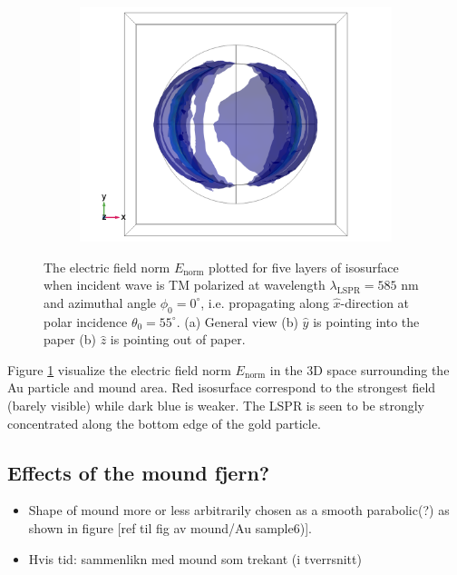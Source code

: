 \begin{figure}[h!]
\begin{subfigure}{0.33\textwidth}
        \centering
        \includegraphics[width=\linewidth, trim=0.6cm 0 1.6cm 0, clip]{figures/ch4/S6/normE/Sample6_nomE_wl585_phi0_TM_ztowardsviewer.png}
        \caption{}
    \end{subfigure}
    \caption{The electric field norm $E_\text{norm}$ plotted for five layers of isosurface when incident wave is TM polarized at wavelength $\lambda_{\text{LSPR}}=585$ nm and azimuthal angle $\phi_0=0^\circ$, i.e. propagating along $\hat{x}$-direction at polar incidence $\theta_0=55^\circ$. (a) General view (b) $\hat{y}$ is pointing into the paper (b) $\hat{z}$ is pointing out of paper.}
    \label{fig:S6_normE_isosurface_LSPR}
\end{figure}

Figure \ref{fig:S6_normE_isosurface_LSPR} visualize the electric field norm $E_\text{norm}$ in the 3D space surrounding the Au particle and mound area. Red isosurface correspond to the strongest field (barely visible) while dark blue is weaker. The LSPR is seen to be strongly concentrated along the bottom edge of the gold particle.

\clearpage
\subsection{Effects of the mound \color{red}fjern?}

\begin{itemize}
    \item Shape of mound more or less arbitrarily chosen as a smooth parabolic(?) as shown in figure [ref til fig av mound/Au sample6)]. 
    \item Hvis tid: sammenlikn med mound som trekant (i tverrsnitt)
\end{itemize}


